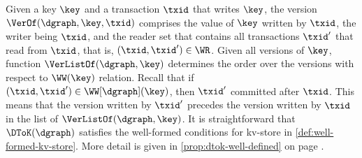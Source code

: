 Given a key \( \key \) and a transaction \( \txid \) that writes \( \key \),
the version \( \VerOf(\dgraph,\key,\txid) \) comprises the value of \( \key \) written by \( \txid \),
the writer being \( \txid \), and the reader set that contains all transactions \( \txid' \)
that read from \( \txid \), that is, \( (\txid,\txid') \in \WR \).
Given all versions of \( \key \), function \( \VerListOf(\dgraph,\key) \)
determines the order over the versions with respect to \( \WW(\key) \) relation.
Recall that if \( (\txid,\txid') \in \WW[\dgraph](\key) \), then \( \txid'\) committed after \( \txid \).
This means that the version written by \( \txid' \) 
precedes the version written by \( \txid \) in the list of \( \VerListOf(\dgraph,\key) \).
It is straightforward that \( \DToK(\dgraph) \) satisfies 
the well-formed conditions for kv-store in \cref{def:well-formed-kv-store}.
More detail is given in \cref{prop:dtok-well-defined} on page \pageref{sec:proof-dep-graph-to-kvs}.

